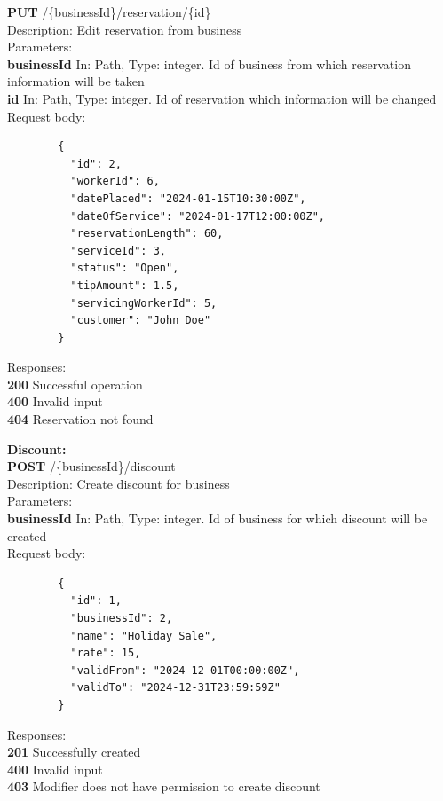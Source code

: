 \documentclass[11pt,a4paper,pdftex]{article}
\begin{document}
\hspace*{1em}\textbf{PUT} /\{businessId\}/reservation/\{id\}\\
\hspace*{2em}Description: Edit reservation from business\\
\hspace*{2em}Parameters:\\
\hspace*{3em}\textbf{businessId} In: Path, Type: integer. Id of business from which reservation information will be taken\\
\hspace*{3em}\textbf{id} In: Path, Type: integer. Id of reservation which information will be changed\\
\hspace*{2em}Request body:\\
\begin{verbatim}
        {
          "id": 2,
          "workerId": 6,
          "datePlaced": "2024-01-15T10:30:00Z",
          "dateOfService": "2024-01-17T12:00:00Z",
          "reservationLength": 60,
          "serviceId": 3,
          "status": "Open",
          "tipAmount": 1.5,
          "servicingWorkerId": 5,
          "customer": "John Doe"
        }
\end{verbatim}
\hspace*{2em}Responses:\\
\hspace*{3em}\textbf{200} Successful operation\\
\hspace*{3em}\textbf{400} Invalid input\\
\hspace*{3em}\textbf{404} Reservation not found

\textbf{Discount:}\\
\hspace*{1em}\textbf{POST} /\{businessId\}/discount\\
\hspace*{2em}Description: Create discount for business\\
\hspace*{2em}Parameters:\\
\hspace*{3em}\textbf{businessId} In: Path, Type: integer. Id of business for which discount will be created\\
\hspace*{2em}Request body:
\begin{verbatim}
        {
          "id": 1,
          "businessId": 2,
          "name": "Holiday Sale",
          "rate": 15,
          "validFrom": "2024-12-01T00:00:00Z",
          "validTo": "2024-12-31T23:59:59Z"
        }
\end{verbatim}
\hspace*{2em}Responses:\\
\hspace*{3em}\textbf{201} Successfully created\\
\hspace*{3em}\textbf{400} Invalid input\\
\hspace*{3em}\textbf{403} Modifier does not have permission to create discount
\end{document}
